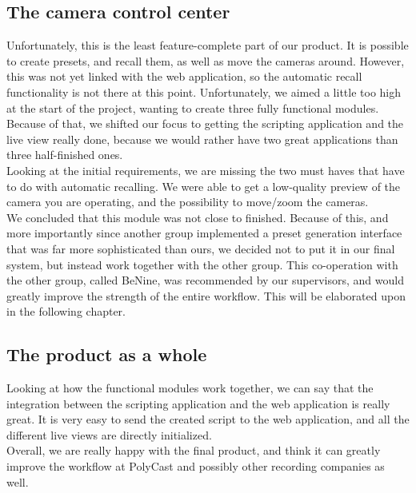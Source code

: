 \subsection{The camera control center}
Unfortunately, this is the least feature-complete part of our product. It is possible to create presets, and recall them, as well as move the cameras around. However, this was not yet linked with the web application, so the automatic recall functionality is not there at this point. Unfortunately, we aimed a little too high at the start of the project, wanting to create three fully functional modules. Because of that, we shifted our focus to getting the scripting application and the live view really done, because we would rather have two great applications than three half-finished ones.\\
Looking at the initial requirements, we are missing the two must haves that have to do with automatic recalling. We were able to get a low-quality preview of the camera you are operating, and the possibility to move/zoom the cameras.\\
We concluded that this module was not close to finished. Because of this, and more importantly since another group implemented a preset generation interface that was far more sophisticated than ours, we decided not to put it in our final system, but instead work together with the other group. This co-operation with the other group, called BeNine, was recommended by our supervisors, and would greatly improve the strength of the entire workflow. This will be elaborated upon in the following chapter.

\subsection*{The product as a whole}
Looking at how the functional modules work together, we can say that the integration between the scripting application and the web application is really great. It is very easy to send the created script to the web application, and all the different live views are directly initialized.\\
Overall, we are really happy with the final product, and think it can greatly improve the workflow at PolyCast and possibly other recording companies as well.